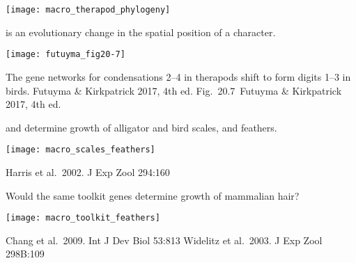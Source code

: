 \documentclass[t,handout]{beamer}  %
\newcommand{\futuyma}[1]{%
	\ifthenelse{\isempty{#1}}%
	{Futuyma \& Kirkpatrick 2017, 4th ed.}%
	{Fig.~#1~Futuyma \& Kirkpatrick 2017, 4th ed.}%
}
\newcommand{\backskip}{\vspace{-0.5\baselineskip}}
\begin{document}

\begin{frame}

\centering

\texttt{[image: macro\_therapod\_phylogeny]}

\end{frame}


\begin{frame}{ is an evolutionary change in the spatial position of a character.}

{\centering

\texttt{[image: futuyma\_fig20-7]}
}

\hangpara The gene networks for condensations 2–4 in therapods shift to form digits 1–3 in birds.
\tinyfill \futuyma{20.7}

\end{frame}



\begin{frame}{ and  determine growth of alligator and bird scales, and feathers.}

\backskip

\texttt{[image: macro\_scales\_feathers]}


\tinyfill Harris et al.~2002. J Exp Zool 294:160

\end{frame}


\begin{frame}{Would the same toolkit genes determine growth of mammalian hair?}

\backskip

\texttt{[image: macro\_toolkit\_feathers]}

\vfilll

\tiny Chang et al.~2009. Int J Dev Biol 53:813
\hfill Widelitz et al.~2003. J Exp Zool 298B:109



\end{frame}



\end{document}
